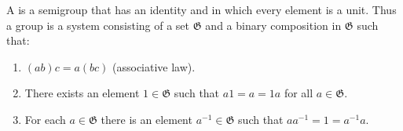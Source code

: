 A  is a semigroup that has an identity and in which every element is a unit. Thus a group is a system consisting of a set $\mathfrak{G}$ and a binary composition in $\mathfrak{G}$ such that:

\begin{enumerate}
\item $(ab)c = a(bc)$ (associative law).
\item There exists an element $1 \in \mathfrak{G}$ such that $a1 = a = 1a$ for all $a \in \mathfrak{G}$.
\item For each $a \in \mathfrak{G}$ there is an element $a^{-1} \in \mathfrak{G}$ such that $aa^{-1} = 1 = a^{-1}a$.
\end{enumerate}
